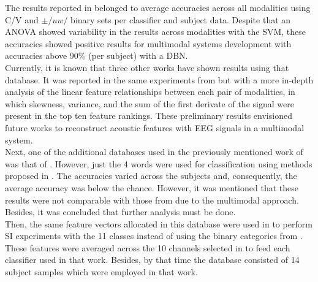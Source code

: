 The results reported in \cite{zhao2015classifying} belonged to average accuracies across all modalities using C/V and $\pm/uw/$ binary sets per classifier and subject data. Despite that an ANOVA showed variability in the results across modalities with the SVM, these accuracies showed positive results for multimodal systems development with accuracies above 90\% (per subject) with a DBN.\\

Currently, it is known that three other works have shown results using that database. It was reported in \cite{zhao2013combining} the same experiments from \cite{zhao2015classifying} but with a more in-depth analysis of the linear feature relationships between each pair of modalities, in which skewness, variance, and the sum of the first derivate of the signal were present in the top ten feature rankings. These preliminary results envisioned future works to reconstruct acoustic features with EEG signals in a multimodal system.\\

Next, one of the additional databases used in the previously mentioned work of \cite{salinas2017bag} was that of \cite{zhao2015classifying}. However, just the 4 words were used for classification using methods proposed in \cite{salinas2017bag}. The accuracies varied across the subjects and, consequently, the average accuracy was below the chance. However, it was mentioned that these results were not comparable with those from \cite{zhao2015classifying} due to the multimodal approach. Besides, it was concluded that further analysis must be done.\\

Then, the same feature vectors allocated in this database were used in \cite{yazaed} to perform SI experiments with the 11 classes instead of using the binary categories from  \cite{zhao2015classifying}. These features were averaged across the 10 channels selected in \cite{zhao2015classifying} to feed each classifier used in that work. Besides, by that time the database consisted of 14 subject samples which were employed in that work.\\

